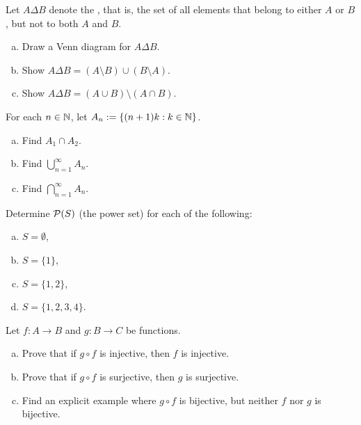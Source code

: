 \begin{samepage}
\begin{exercise}
Let $A \Delta B$ denote the
\emph{}, that is, the set of all elements that
belong to either $A$ or $B$, but not to both $A$ and $B$.
\begin{enumerate}[a)]
\item
Draw a Venn diagram for
$A \Delta B$.
\item
Show $A \Delta B = (A \setminus B) \cup (B \setminus A)$.
\item
Show $A \Delta B = (A \cup B) \setminus ( A \cap B)$.
\end{enumerate}
\end{exercise}
\end{samepage}

\begin{exercise}
For each $n \in {\mathbb{N}}$, let $A_n := \{ (n+1)k : k \in {\mathbb{N}} \}$.
\begin{enumerate}[a)]
\item Find $A_1 \cap A_2$.
\item Find $\bigcup_{n=1}^\infty A_n$.
\item Find $\bigcap_{n=1}^\infty A_n$.
\end{enumerate}
\end{exercise}

\begin{samepage}
\begin{exercise}
Determine ${\mathcal{P}}(S)$ (the power set) for each of the following:
\begin{enumerate}[a)]
\item $S = \emptyset$,
\item $S = \{1\}$,
\item $S = \{1,2\}$,
\item $S = \{1,2,3,4\}$.
\end{enumerate}
\end{exercise}
\end{samepage}


\begin{exercise}
Let $f \colon A \to B$ and $g \colon B \to C$ be functions.
\begin{enumerate}[a)]
\item
Prove that if $g \circ f$ is injective, then $f$ is injective.
\item
Prove that if $g \circ f$ is surjective, then $g$ is surjective.
\item
Find an explicit example where $g \circ f$ is bijective, but neither $f$
nor $g$ is bijective.
\end{enumerate}
\end{exercise}

